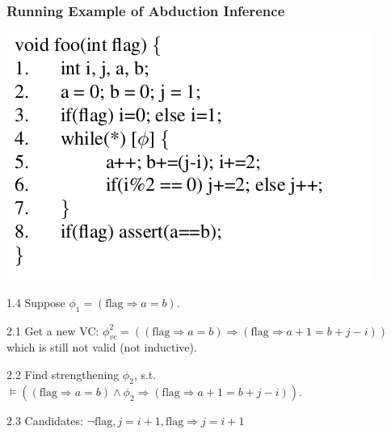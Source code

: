 \documentclass[11pt]{beamer}
\begin{document}
\begin{frame}\frametitle{Running Example of Abduction Inference}
\begin{center}

\includegraphics[scale=0.25]{exp.png}

\end{center}
1.4 Suppose $\phi_1 = (\text{flag}\Rightarrow a = b)$.

2.1 Get a new VC: $\phi_{vc}^2 = ((\text{flag}\Rightarrow a = b)\Rightarrow (\text{flag}\Rightarrow a + 1 = b + j - i))$ which is still not valid (not inductive).

2.2 Find strengthening $\phi_2$, s.t. $\models ((\text{flag}\Rightarrow a = b )\wedge \phi_2 \Rightarrow (\text{flag}\Rightarrow a + 1 = b + j - i))$.

2.3 Candidates: $\neg \text{flag}, j = i + 1, \text{flag}\Rightarrow  j = i + 1$
\end{frame}
\end{document}
